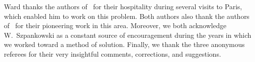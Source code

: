 \documentclass[proceedings]{aofa}
\begin{document}
\nocite{*}
\acknowledgements
\label{sec:ack}
Ward thanks the authors of~\cite{Bassino:2012} for their hospitality
during several visits to Paris, which enabled him to work on this
problem.  Both authors also thank the authors of~\cite{Park:2009} for
their pioneering work in this area.  Moreover, we both acknowledge
W.~Szpankowski as a constant source of encouragement during the years
in which we worked toward a method of solution.
Finally, we thank the three anonymous referees for their very
insightful comments, corrections, and suggestions.



\label{sec:biblio}
\end{document}
